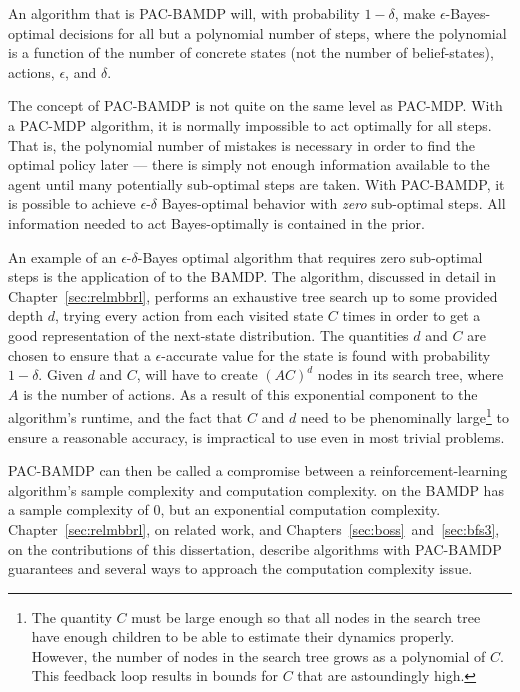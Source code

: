 An algorithm that is PAC-BAMDP will, with probability $1-\delta$, make $\epsilon$-Bayes-optimal decisions for all but a polynomial number of steps, where the polynomial is a function of the number of concrete states (not the number of belief-states), actions, $\epsilon$, and $\delta$.

The concept of PAC-BAMDP is not quite on the same level as PAC-MDP. With a PAC-MDP algorithm, it is normally impossible to act optimally for all steps. That is, the polynomial number of mistakes is necessary in order to find the optimal policy later --- there is simply not enough information available to the agent until many potentially sub-optimal steps are taken. With PAC-BAMDP, it is possible to achieve $\epsilon$-$\delta$ Bayes-optimal behavior with \emph{zero} sub-optimal steps. All information needed to act Bayes-optimally is contained in the prior.

An example of an $\epsilon$-$\delta$-Bayes optimal algorithm that requires zero sub-optimal steps is the application of  to the BAMDP. The  algorithm, discussed in detail in Chapter~\ref{sec:relmbbrl}, performs an exhaustive tree search up to some provided depth $d$, trying every action from each visited state $C$ times in order to get a good representation of the next-state distribution. The quantities $d$ and $C$ are chosen to ensure that a $\epsilon$-accurate value for the state is found with probability $1-\delta$. Given $d$ and $C$,  will have to create $(A C)^d$ nodes in its search tree, where $A$ is the number of actions. As a result of this exponential component to the algorithm's runtime, and the fact that $C$ and $d$ need to be phenominally large\footnote{The quantity $C$ must be large enough so that all nodes in the search tree have enough children to be able to estimate their dynamics properly. However, the number of nodes in the search tree grows as a polynomial of $C$. This feedback loop results in bounds for $C$ that are astoundingly high.} to ensure a reasonable accuracy,  is impractical to use even in most trivial problems.

PAC-BAMDP can then be called a compromise between a reinforcement-learning algorithm's sample complexity and computation complexity.  on the BAMDP has a sample complexity of $0$, but an exponential computation complexity. Chapter~\ref{sec:relmbbrl}, on related work, and Chapters~\ref{sec:boss}~and~\ref{sec:bfs3}, on the contributions of this dissertation, describe algorithms with PAC-BAMDP guarantees and several ways to approach the computation complexity issue.

